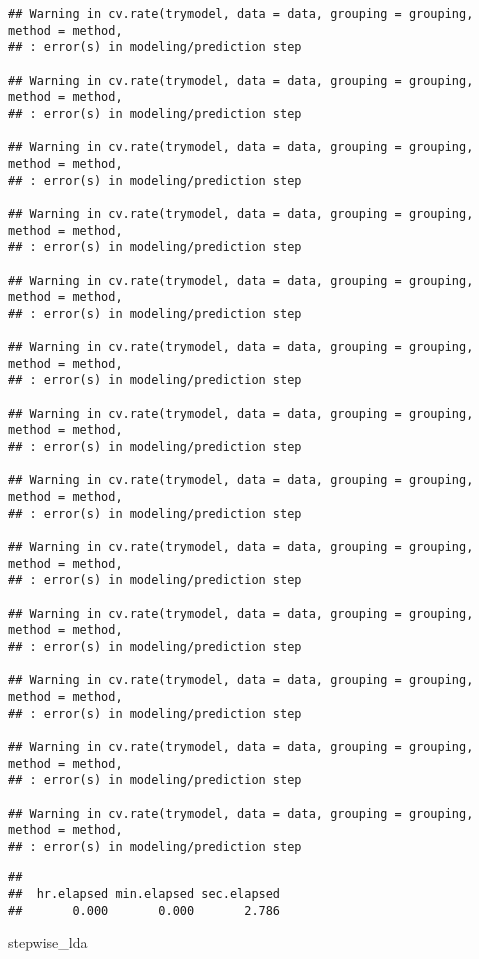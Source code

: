 \documentclass[
]{article}
\newenvironment{Shaded}{\begin{snugshade}}{\end{snugshade}}
\newcommand{\NormalTok}[1]{#1}
\begin{document}
\begin{verbatim}
## Warning in cv.rate(trymodel, data = data, grouping = grouping, method = method,
## : error(s) in modeling/prediction step

## Warning in cv.rate(trymodel, data = data, grouping = grouping, method = method,
## : error(s) in modeling/prediction step

## Warning in cv.rate(trymodel, data = data, grouping = grouping, method = method,
## : error(s) in modeling/prediction step

## Warning in cv.rate(trymodel, data = data, grouping = grouping, method = method,
## : error(s) in modeling/prediction step

## Warning in cv.rate(trymodel, data = data, grouping = grouping, method = method,
## : error(s) in modeling/prediction step

## Warning in cv.rate(trymodel, data = data, grouping = grouping, method = method,
## : error(s) in modeling/prediction step

## Warning in cv.rate(trymodel, data = data, grouping = grouping, method = method,
## : error(s) in modeling/prediction step

## Warning in cv.rate(trymodel, data = data, grouping = grouping, method = method,
## : error(s) in modeling/prediction step

## Warning in cv.rate(trymodel, data = data, grouping = grouping, method = method,
## : error(s) in modeling/prediction step

## Warning in cv.rate(trymodel, data = data, grouping = grouping, method = method,
## : error(s) in modeling/prediction step

## Warning in cv.rate(trymodel, data = data, grouping = grouping, method = method,
## : error(s) in modeling/prediction step

## Warning in cv.rate(trymodel, data = data, grouping = grouping, method = method,
## : error(s) in modeling/prediction step

## Warning in cv.rate(trymodel, data = data, grouping = grouping, method = method,
## : error(s) in modeling/prediction step
\end{verbatim}

\begin{verbatim}
## 
##  hr.elapsed min.elapsed sec.elapsed 
##       0.000       0.000       2.786
\end{verbatim}

\begin{Shaded}
\begin{Highlighting}[]
\NormalTok{stepwise\_lda}
\end{Highlighting}
\end{Shaded}
\end{document}

